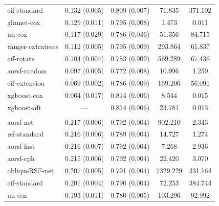 \documentclass[twoside,11pt]{article}\usepackage[]{graphicx}\usepackage[]{xcolor}
\newenvironment{knitrout}{}{} %
\begin{document}
\begin{knitrout}
\begin{longtable}[t]{lcccc}
\hspace{1em}cif-standard & 0.132 (0.005) & 0.809 (0.007) & 71.835 & 371.102\\
\hspace{1em}glmnet-cox & 0.129 (0.011) & 0.795 (0.008) & 1.473 & 0.011\\
\hspace{1em}nn-cox & 0.117 (0.029) & 0.786 (0.046) & 51.356 & 84.715\\
\hspace{1em}ranger-extratrees & 0.112 (0.005) & 0.795 (0.009) & 293.864 & 61.837\\
\hspace{1em}cif-rotate & 0.104 (0.004) & 0.783 (0.009) & 569.289 & 67.436\\
\hspace{1em}aorsf-random & 0.097 (0.005) & 0.772 (0.008) & 10.996 & 1.259\\
\hspace{1em}cif-extension & 0.069 (0.002) & 0.786 (0.009) & 169.206 & 56.091\\
\hspace{1em}xgboost-cox & 0.064 (0.017) & 0.814 (0.006) & 8.544 & 0.015\\
\hspace{1em}xgboost-aft & --- & 0.814 (0.006) & 23.781 & 0.013\\
\addlinespace[0.3em]
\multicolumn{5}{l}{\textit{\textbf{ARIC; death, n = 13623, p = 41}}}\\
\hline
\hspace{1em}aorsf-net & 0.217 (0.006) & 0.792 (0.004) & 902.210 & 2.343\\
\hspace{1em}rsf-standard & 0.216 (0.006) & 0.789 (0.004) & 14.727 & 1.274\\
\hspace{1em}aorsf-fast & 0.216 (0.007) & 0.792 (0.004) & 7.268 & 2.936\\
\hspace{1em}aorsf-cph & 0.215 (0.006) & 0.792 (0.004) & 22.420 & 3.070\\
\hspace{1em}obliqueRSF-net & 0.207 (0.005) & 0.791 (0.004) & 7329.229 & 331.164\\
\hspace{1em}cif-standard & 0.201 (0.004) & 0.790 (0.004) & 72.253 & 384.744\\
\hspace{1em}nn-cox & 0.193 (0.011) & 0.780 (0.005) & 103.296 & 92.992\\

\end{longtable}
\end{knitrout}
\end{document}
